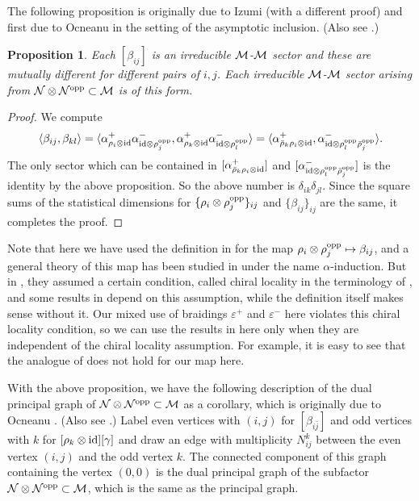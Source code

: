 \documentclass[12pt]{article}
\def\lan{\langle}
\def\ran{\rangle}
\def\id{{\rm id}}
\def\o{{\rm opp}}
\def\a{\alpha}
\def\be{\beta}
\def\de{\delta}
\def\e{\varepsilon}
\def\ga{\gamma}
\newtheorem{proposition}[theorem]{Proposition}
\def\N{{\cal N}}
\def\M{{\cal M}}
\begin{document}
The following proposition is originally
due to Izumi \cite{I4} (with a different
proof) and first due to Ocneanu \cite{O6} in the setting
of the asymptotic inclusion.  (Also see \cite{EK3}.)

\begin{proposition}
Each $[\be_{ij}]$ is an irreducible $\M$-$\M$ sector and
these are mutually different for different pairs of
$i,j$.  Each irreducible
$\M$-$\M$ sector arising from $\N\otimes\N^\o\subset \M$ is of this
form.
\end{proposition}

\begin{proof}
We compute
$$\lan \be_{ij},\be_{kl} \ran=
\lan \a^+_{\rho_i\otimes\id}
\a^-_{\id\otimes\rho_j^\o},
\a^+_{\rho_k\otimes\id}
\a^-_{\id\otimes\rho_l^\o}\ran=
\lan \a^+_{\bar\rho_k\rho_i\otimes\id},
\a^-_{\id\otimes\rho_l^\o\bar\rho_j^\o}\ran.$$
The only sector which can be contained in
$[\a^+_{\bar\rho_k\rho_i\otimes\id}]$ and
$[\a^-_{\id\otimes\rho_l^\o\bar\rho_j^\o}]$ is the identity
by the above proposition.  So the above number is
$\de_{ik}\de_{jl}$.
Since the square sums of the statistical dimensions
for $\{\rho_i\otimes\rho_j^\o\}_{ij}$ and $\{\be_{ij}\}_{ij}$
are the same, it completes the proof.
\end{proof}

Note that here we have used the definition in \cite{LR} for the map
$\rho_i\otimes\rho_j^\o\mapsto \be_{ij}$, and a general theory
of this map has been studied in \cite{BE} under the name
$\a$-induction.   But in \cite{BE}, they assumed a certain
condition, called chiral locality in the terminology of \cite{BEK},
and some results in \cite{BE} depend on this assumption, while
the definition itself makes sense without it.  Our mixed use
of braidings $\e^+$ and $\e^-$ here violates this chiral locality
condition, so we can use the results in \cite{BE} here only when
they are independent of the chiral locality assumption.
For example, it is easy to see that the analogue of
\cite[I, Theorem 3.9]{BE} does not hold for our map here.

With the above proposition,
we have the following description of the dual
principal graph of $\N\otimes\N^\o\subset \M$ as a corollary,
which is originally due to Ocneanu \cite{O6}.
(Also see \cite{EK3}.)  Label even vertices with $(i,j)$ for
$[\be_{i\bar j}]$ and odd vertices with $k$
for $[\rho_k\otimes\id][\ga]$ and draw an edge with
multiplicity $N_{ij}^k$ between the even vertex $(i,j)$
and the odd vertex $k$.  The connected component of this
graph containing the vertex $(0,0)$ is the dual principal graph
of the subfactor $\N\otimes\N^\o\subset \M$, which is the same as
the principal graph.
\end{document}
